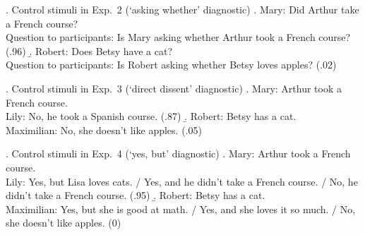 \documentclass[times,linguex,xcolor]{glossa}
\begin{document}
\ex.\label{control2} Control stimuli in Exp.~2 (`asking whether' diagnostic)
\a. Mary: Did Arthur take a French course?
\\ Question to participants: Is Mary asking whether Arthur took a French course? (.96)
\b. Robert: Does Betsy have a cat?
\\ Question to participants: Is Robert asking whether Betsy loves apples? (.02)

\ex.\label{control3} Control stimuli in Exp.~3 (`direct dissent' diagnostic)
\a. Mary: Arthur took a French course.
\\ Lily: No, he took a Spanish course. (.87)
\b. Robert: Betsy has a cat.
\\ Maximilian: No, she doesn't like apples. (.05)

\ex.\label{control4} Control stimuli in Exp.~4 (`yes, but' diagnostic)
\a. Mary: Arthur took a French course.
\\ Lily: Yes, but Lisa loves cats. / Yes, and he didn't take a French course. / No, he didn't take a French course. (.95)
\b. Robert: Betsy has a cat.
\\ Maximilian: Yes, but she is good at math. / Yes, and she loves it so much. / No, she doesn't like apples. (0)
\end{document}
